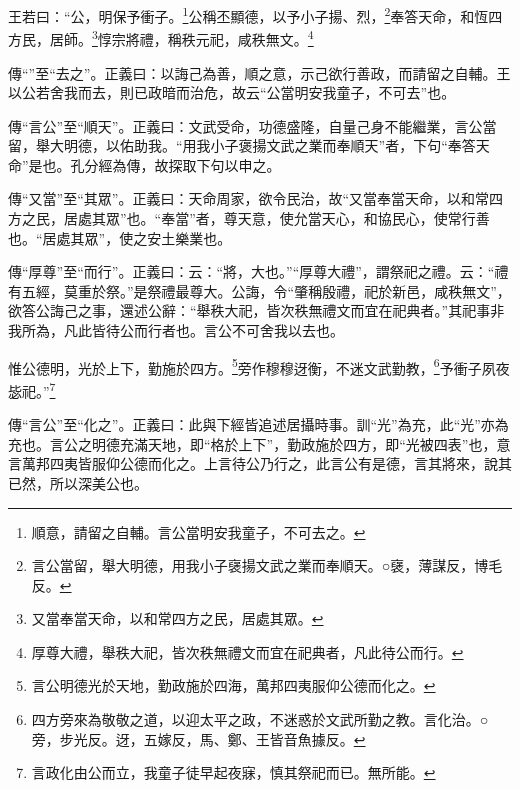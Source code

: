 王若曰：“公，明保予衝子。\footnote{順意，請留之自輔。言公當明安我童子，不可去之。}公稱丕顯德，以予小子揚、烈，\footnote{言公當留，舉大明德，用我小子襃揚文武之業而奉順天。○襃，薄謀反，博毛反。}奉答天命，和恆四方民，居師。\footnote{又當奉當天命，以和常四方之民，居處其眾。}惇宗將禮，稱秩元祀，咸秩無文。\footnote{厚尊大禮，舉秩大祀，皆次秩無禮文而宜在祀典者，凡此待公而行。}


{\noindent\zhuan{}\fzbyks 傳“”至“去之”。正義曰：以誨己為善，順之意，示己欲行善政，而請留之自輔。王以公若舍我而去，則已政暗而治危，故云“公當明安我童子，不可去”也。 \par}

{\noindent\zhuan{}\fzbyks 傳“言公”至“順天”。正義曰：文武受命，功德盛隆，自量己身不能繼業，言公當留，舉大明德，以佑助我。“用我小子褒揚文武之業而奉順天”者，下句“奉答天命”是也。孔分經為傳，故探取下句以申之。 \par}

{\noindent\zhuan{}\fzbyks 傳“又當”至“其眾”。正義曰：天命周家，欲令民治，故“又當奉當天命，以和常四方之民，居處其眾”也。“奉當”者，尊天意，使允當天心，和協民心，使常行善也。“居處其眾”，使之安土樂業也。 \par}

{\noindent\zhuan{}\fzbyks 傳“厚尊”至“而行”。正義曰：云：“將，大也。”“厚尊大禮”，謂祭祀之禮。云：“禮有五經，莫重於祭。”是祭禮最尊大。公誨，令“肇稱殷禮，祀於新邑，咸秩無文”，欲答公誨己之事，還述公辭：“舉秩大祀，皆次秩無禮文而宜在祀典者。”其祀事非我所為，凡此皆待公而行者也。言公不可舍我以去也。 \par}

惟公德明，光於上下，勤施於四方。\footnote{言公明德光於天地，勤政施於四海，萬邦四夷服仰公德而化之。}旁作穆穆迓衡，不迷文武勤教，\footnote{四方旁來為敬敬之道，以迎太平之政，不迷惑於文武所勤之教。言化治。○旁，步光反。迓，五嫁反，馬、鄭、王皆音魚據反。}予衝子夙夜毖祀。”\footnote{言政化由公而立，我童子徒早起夜寐，慎其祭祀而已。無所能。}

{\noindent\zhuan{}\fzbyks 傳“言公”至“化之”。正義曰：此與下經皆追述居攝時事。訓“光”為充，此“光”亦為充也。言公之明德充滿天地，即“格於上下”，勤政施於四方，即“光被四表”也，意言萬邦四夷皆服仰公德而化之。上言待公乃行之，此言公有是德，言其將來，說其已然，所以深美公也。 \par}

